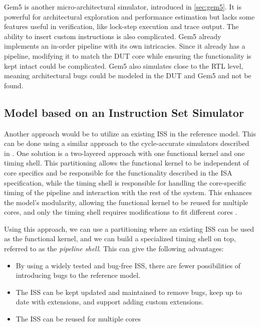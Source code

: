 Gem5 is another micro-architectural simulator, introduced in \cref{sec:gem5}.
It is powerful for architectural exploration and performance estimation but lacks some features useful in verification, like lock-step execution and trace output. The ability to insert custom instructions is also complicated. Gem5 already implements an in-order pipeline with its own intricacies. Since it already has a pipeline, modifying it to match the DUT core while ensuring the functionality is kept intact could be complicated. Gem5 also simulates close to the RTL level, meaning architectural bugs could be modeled in the DUT and Gem5 and not be found. \cite{noauthor_gem5_2023}


\subsection{Model based on an Instruction Set Simulator}

Another approach would be to utilize an existing ISS in the reference model. This can be done using a similar approach to the cycle-accurate simulators described in . One solution is a two-layered approach with one functional kernel and one timing shell. This partitioning allows the functional kernel to be independent of core specifics and be responsible for the functionality described in the ISA specification, while the timing shell is responsible for handling the core-specific timing of the pipeline and interaction with the rest of the system. This enhances the model's modularity, allowing the functional kernel to be reused for multiple cores, and only the timing shell requires modifications to fit different cores \cite{chiang_efficient_2009}.

Using this approach, we can use a partitioning where an existing ISS can be used as the functional kernel, and we can build a specialized timing shell on top, referred to as the \textit{pipeline shell}.
This can give the following advantages:

\begin{itemize}
    \item By using a widely tested and bug-free ISS, there are fewer possibilities of introducing bugs to the reference model. 
    \item The ISS can be kept updated and maintained to remove bugs, keep up to date with extensions, and support adding custom extensions.
    \item The ISS can be reused for multiple cores
\end{itemize}

